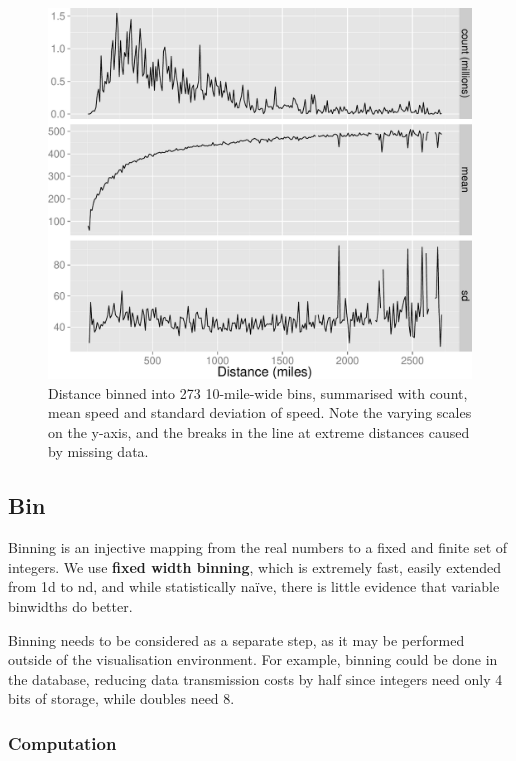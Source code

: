 \documentclass[journal]{vgtc}                %
\begin{document}
\begin{figure}[htb]
 \centering
 \includegraphics[width=\linewidth]{condense}
 \caption{Distance binned into 273 10-mile-wide bins, summarised with count, mean speed and standard deviation of speed. Note the varying scales on the y-axis, and the breaks in the line at extreme distances caused by missing data.}
 \label{fig:condense}
\end{figure}

\subsection{Bin}
\label{sub:bin}

Binning is an injective mapping from the real numbers to a fixed and finite set of integers. We use {\bf fixed width binning}, which is extremely fast, easily extended from 1d to nd, and while statistically na\"ive, there is little evidence that variable binwidths do better. 

Binning needs to be considered as a separate step, as it may be performed outside of the visualisation environment. For example, binning could be done in the database, reducing data transmission costs by half since integers need only 4 bits of storage, while doubles need 8. 

\subsubsection{Computation}
\end{document}
